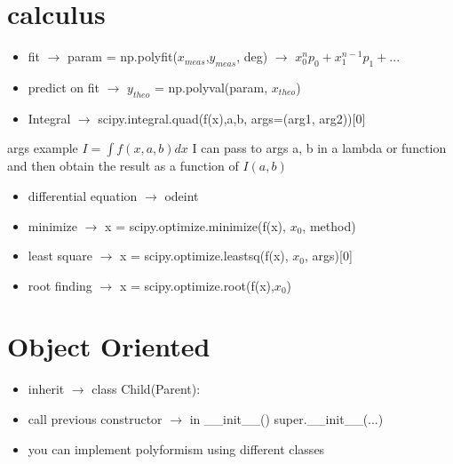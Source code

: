 \documentclass{article}
\begin{document}
\section{calculus}
\begin{itemize}
\item fit $\rightarrow$ param = np.polyfit($x_{meas}$,$y_{meas}$, deg)  $\rightarrow$  $x_0^n p_0+x_1^{n-1} p_1 + ...$
\item predict on fit $\rightarrow$ $y_{theo}$ = np.polyval(param, $x_{theo}$)
\item Integral  $\rightarrow$ scipy.integral.quad(f(x),a,b, args=(arg1, arg2))[0] 
\end{itemize}
args  example $I = \int f(x,a,b) dx $ I can pass to args a, b in a lambda or function and then  obtain the result as a function of $I(a,b)$ 
\begin{itemize}
\item differential equation $\rightarrow$ odeint
\item minimize $\rightarrow$ x = scipy.optimize.minimize(f(x), $x_0$, method)
\item least square $\rightarrow$ x = scipy.optimize.leastsq(f(x), $x_0$, args)[0]
\item root finding $\rightarrow$ x = scipy.optimize.root(f(x),$x_0$)
\end{itemize}
\section{Object Oriented}
\begin{itemize}
\item inherit $\rightarrow$ class Child(Parent):
\item call previous constructor $\rightarrow$ in \_\_init\_\_() super.\_\_init\_\_(...)
\item you can implement polyformism using different classes
\end{itemize}
\end{document}
